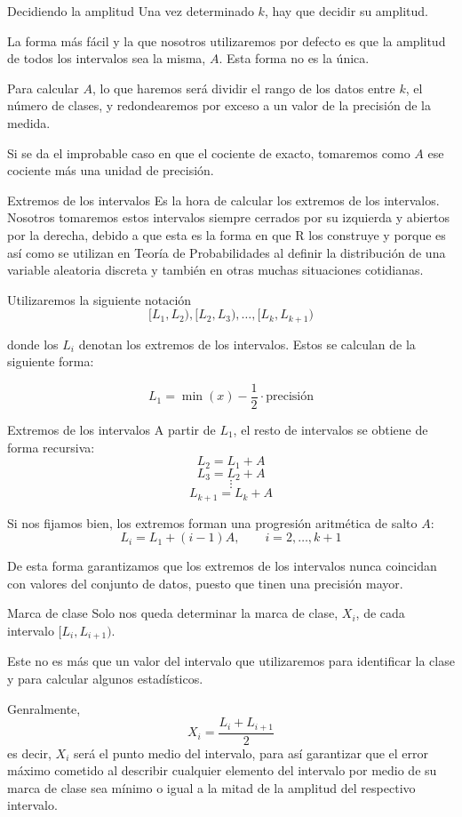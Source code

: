 \documentclass[
  ignorenonframetext,
]{beamer}
\begin{document}
\begin{frame}{Decidiendo la amplitud}
\protect\hypertarget{decidiendo-la-amplitud}{}
Una vez determinado \(k\), hay que decidir su amplitud.

La forma más fácil y la que nosotros utilizaremos por defecto es que la
amplitud de todos los intervalos sea la misma, \(A\). Esta forma no es
la única.

Para calcular \(A\), lo que haremos será dividir el rango de los datos
entre \(k\), el número de clases, y redondearemos por exceso a un valor
de la precisión de la medida.

Si se da el improbable caso en que el cociente de exacto, tomaremos como
\(A\) ese cociente más una unidad de precisión.
\end{frame}

\begin{frame}{Extremos de los intervalos}
\protect\hypertarget{extremos-de-los-intervalos}{}
Es la hora de calcular los extremos de los intervalos. Nosotros
tomaremos estos intervalos siempre cerrados por su izquierda y abiertos
por la derecha, debido a que esta es la forma en que R los construye y
porque es así como se utilizan en Teoría de Probabilidades al definir la
distribución de una variable aleatoria discreta y también en otras
muchas situaciones cotidianas.

Utilizaremos la siguiente notación
\[[L_1,L_2),[L_2,L_3),\dots,[L_k,L_{k+1})\]

donde los \(L_i\) denotan los extremos de los intervalos. Estos se
calculan de la siguiente forma:

\[L_1 = \min(x)-\frac{1}{2}\cdot \text{precisión}\]
\end{frame}

\begin{frame}{Extremos de los intervalos}
\protect\hypertarget{extremos-de-los-intervalos-1}{}
A partir de \(L_1\), el resto de intervalos se obtiene de forma
recursiva: \[L_2 = L_1 + A\] \[L_3 = L_2 + A\] \[\vdots\]
\[L_{k+1} = L_k+A\]

Si nos fijamos bien, los extremos forman una progresión aritmética de
salto \(A\): \[L_{i} = L_{1}+(i-1)A,\qquad i=2,\dots,k+1\]

De esta forma garantizamos que los extremos de los intervalos nunca
coincidan con valores del conjunto de datos, puesto que tinen una
precisión mayor.
\end{frame}

\begin{frame}{Marca de clase}
\protect\hypertarget{marca-de-clase}{}
Solo nos queda determinar la marca de clase, \(X_i\), de cada intervalo
\([L_i,L_{i+1})\).

Este no es más que un valor del intervalo que utilizaremos para
identificar la clase y para calcular algunos estadísticos.

Genralmente, \[X_i = \frac{L_i+L_{i+1}}{2}\] es decir, \(X_i\) será el
punto medio del intervalo, para así garantizar que el error máximo
cometido al describir cualquier elemento del intervalo por medio de su
marca de clase sea mínimo o igual a la mitad de la amplitud del
respectivo intervalo.
\end{frame}
\end{document}
